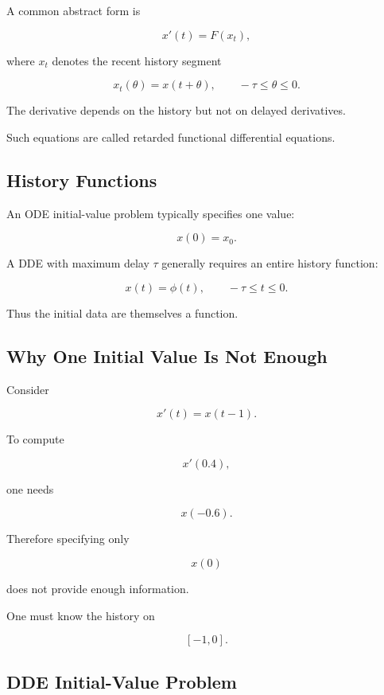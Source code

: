 A common abstract form is

\[
\boxed{
x'(t)
=
F(x_t),
}
\]

where \(x_t\) denotes the recent history segment

\[
\boxed{
x_t(\theta)
=
x(t+\theta),
\qquad
-\tau\leq\theta\leq0.
}
\]

The derivative depends on the history but not on delayed derivatives.

Such equations are called retarded functional differential equations.

\subsection{History Functions}
\label{subsec:dde-history-functions}

An ODE initial-value problem typically specifies one value:

\[
x(0)=x_0.
\]

A DDE with maximum delay \(\tau\) generally requires an entire history
function:

\[
\boxed{
x(t)
=
\phi(t),
\qquad
-\tau\leq t\leq0.
}
\]

Thus the initial data are themselves a function.

\subsection{Why One Initial Value Is Not Enough}
\label{subsec:dde-one-value-not-enough}

Consider

\[
x'(t)
=
x(t-1).
\]

To compute

\[
x'(0.4),
\]

one needs

\[
x(-0.6).
\]

Therefore specifying only

\[
x(0)
\]

does not provide enough information.

One must know the history on

\[
\boxed{
[-1,0].
}
\]

\subsection{DDE Initial-Value Problem}
\label{subsec:dde-initial-value-problem}

